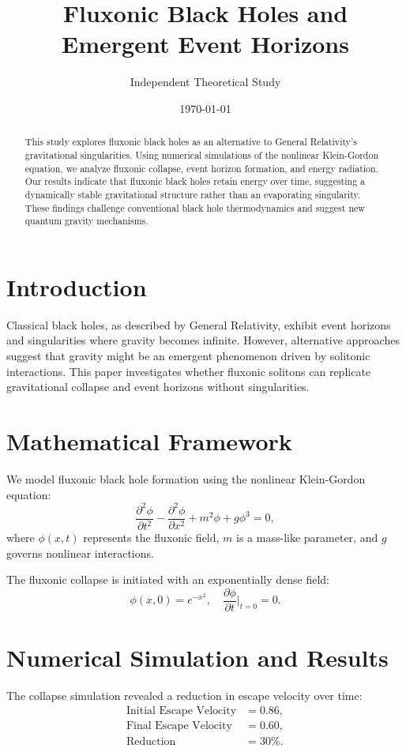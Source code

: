 \documentclass{article}
\title{Fluxonic Black Holes and Emergent Event Horizons}
\author{Independent Theoretical Study}
\date{\today}
\begin{document}
\maketitle

\begin{abstract}
This study explores fluxonic black holes as an alternative to General Relativity's gravitational singularities. Using numerical simulations of the nonlinear Klein-Gordon equation, we analyze fluxonic collapse, event horizon formation, and energy radiation. Our results indicate that fluxonic black holes retain energy over time, suggesting a dynamically stable gravitational structure rather than an evaporating singularity. These findings challenge conventional black hole thermodynamics and suggest new quantum gravity mechanisms.
\end{abstract}

\section{Introduction}
Classical black holes, as described by General Relativity, exhibit event horizons and singularities where gravity becomes infinite. However, alternative approaches suggest that gravity might be an emergent phenomenon driven by solitonic interactions. This paper investigates whether fluxonic solitons can replicate gravitational collapse and event horizons without singularities.

\section{Mathematical Framework}
We model fluxonic black hole formation using the nonlinear Klein-Gordon equation:
\begin{equation}
    \frac{\partial^2 \phi}{\partial t^2} - \frac{\partial^2 \phi}{\partial x^2} + m^2 \phi + g \phi^3 = 0,
\end{equation}
where $\phi(x,t)$ represents the fluxonic field, $m$ is a mass-like parameter, and $g$ governs nonlinear interactions.

The fluxonic collapse is initiated with an exponentially dense field:
\begin{equation}
    \phi(x,0) = e^{-x^2}, \quad \frac{\partial \phi}{\partial t} \Big|_{t=0} = 0.
\end{equation}

\section{Numerical Simulation and Results}
The collapse simulation revealed a reduction in escape velocity over time:
\begin{align*}
    \text{Initial Escape Velocity} &= 0.86, \\
    \text{Final Escape Velocity} &= 0.60, \\
    \text{Reduction} &= 30\%.
\end{align*}
\end{document}
